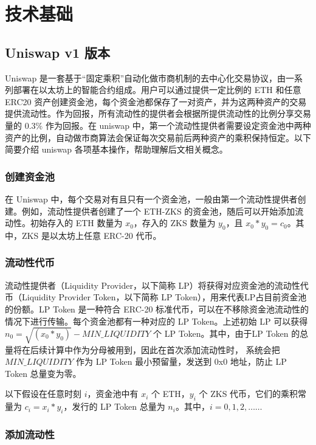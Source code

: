 \documentclass[]{template/llncs}
\begin{document}
\section{技术基础}

\subsection{Uniswap v1 版本}
Uniswap\cite{uniswapv1} 是一套基于“固定乘积”自动化做市商机制的去中心化交易协议，由一系列部署在以太坊上的智能合约组成。用户可以通过提供一定比例的 ETH 和任意 ERC20 资产创建资金池，每个资金池都保存了一对资产，并为这两种资产的交易提供流动性。作为回报，所有流动性的提供者会根据所提供流动性的比例分享交易量的 0.3\% 作为回报。在 uniswap 中，第一个流动性提供者需要设定资金池中两种资产的比例，自动做市商算法会保证每次交易前后两种资产的乘积保持恒定。以下简要介绍 uniswap 各项基本操作，帮助理解后文相关概念。

\subsubsection{创建资金池}

在 Uniswap 中，每个交易对有且只有一个资金池，一般由第一个流动性提供者创建。例如，流动性提供者创建了一个 ETH-ZKS 的资金池，随后可以开始添加流动性。初始存入的 ETH 数量为 $x_0$，存入的 ZKS 数量为 $y_0$，且 $x_0*y_0 = c_0$。其中，ZKS 是以太坊上任意 ERC-20 代币。

\subsubsection{流动性代币}

流动性提供者（Liquidity Provider，以下简称 LP）将获得对应资金池的流动性代币（Liquidity Provider Token，以下简称 LP Token），用来代表LP占目前资金池的份额。LP Token 是一种符合 ERC-20 标准代币，可以在不移除资金池流动性的情况下进行传输。每个资金池都有一种对应的 LP Token。上述初始 LP 可以获得 $n_0 = \sqrt{(x_0*y_0)} - MIN\_LIQUIDITY$ 个 LP Token。其中，由于LP Token 的总量将在后续计算中作为分母被用到，因此在首次添加流动性时， 系统会把 $MIN\_LIQUIDITY$ 作为 LP Token 最小预留量，发送到 0x0 地址，防止 LP Token 总量变为零。

以下假设在任意时刻 $i$，资金池中有 $x_i$ 个 ETH，$y_i$ 个 ZKS 代币，它们的乘积常量为 $c_i = x_i *y_i$，发行的 LP Token 总量为 $n_i$。其中，$i = 0,1,2,……$

\subsubsection{添加流动性}
\end{document}
